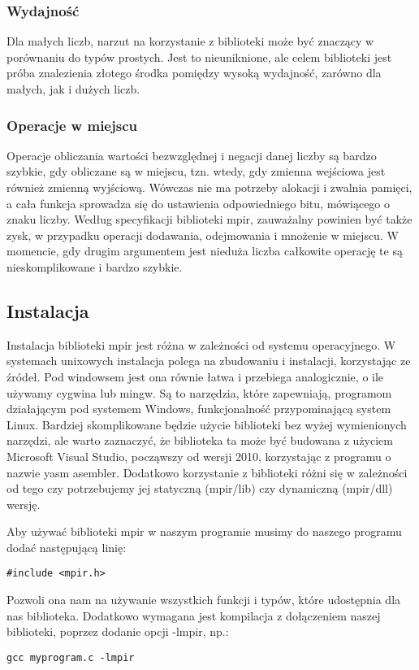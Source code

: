\documentclass[twoside,a4paper]{book}
\begin{document}
\subsubsection{Wydajność}
Dla małych liczb, narzut na korzystanie z biblioteki może być znaczący w porównaniu do typów prostych. Jest to nieuniknione, ale celem biblioteki jest próba znalezienia złotego środka pomiędzy wysoką wydajność, zarówno dla małych, jak i dużych liczb. 

\subsubsection{Operacje w miejscu}
Operacje obliczania wartości bezwzględnej i negacji danej liczby są bardzo szybkie, gdy obliczane są w miejscu, tzn. wtedy, gdy zmienna wejściowa jest również zmienną wyjściową. Wówczas nie ma potrzeby alokacji i zwalnia pamięci, a cała funkcja sprowadza się do ustawienia odpowiedniego bitu, mówiącego o znaku liczby. Według specyfikacji biblioteki mpir, zauważalny powinien być także zysk, w przypadku operacji dodawania, odejmowania i mnożenie w miejscu. W momencie, gdy drugim argumentem jest nieduża liczba całkowite operację te są nieskomplikowane i bardzo szybkie.

\subsection{Instalacja}

Instalacja biblioteki mpir jest różna w zależności od systemu operacyjnego. W systemach unixowych instalacja polega na zbudowaniu i instalacji, korzystając ze źródeł. Pod windowsem jest ona równie łatwa i przebiega analogicznie, o ile używamy cygwina lub mingw. Są to narzędzia, które zapewniają, programom działającym pod systemem Windows, funkcjonalność przypominającą system Linux. Bardziej skomplikowane będzie użycie biblioteki bez wyżej wymienionych narzędzi, ale warto zaznaczyć, że biblioteka ta może być budowana z użyciem Microsoft Visual Studio, począwszy od wersji 2010, korzystając z programu o nazwie yasm asembler. Dodatkowo korzystanie z biblioteki różni się w zależności od tego czy potrzebujemy jej statyczną (mpir/lib) czy dynamiczną (mpir/dll) wersję.

Aby używać biblioteki mpir w naszym programie musimy do naszego programu dodać następującą linię:
\begin{lstlisting}
#include <mpir.h>
\end{lstlisting}

Pozwoli ona nam na używanie wszystkich funkcji i typów, które udostępnia dla nas biblioteka. Dodatkowo wymagana jest kompilacja z dołączeniem naszej biblioteki, poprzez dodanie opcji -lmpir, np.:
\begin{lstlisting}
gcc myprogram.c -lmpir
\end{lstlisting}
\end{document}
